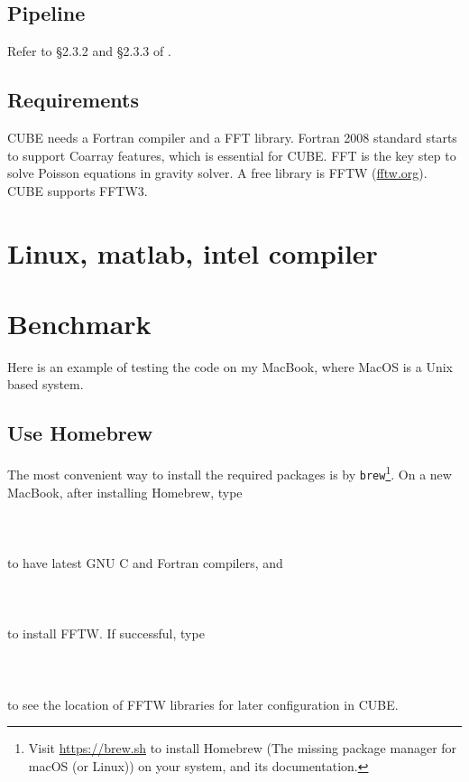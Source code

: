 \documentclass[12pt]{article}
\begin{document}
\subsection{Pipeline}

Refer to \S 2.3.2 and \S 2.3.3 of \cite{2018ApJS..237...24Y}.

\subsection{Requirements}

CUBE needs a Fortran compiler and a FFT library. Fortran 2008 standard starts to support Coarray features, which is essential for CUBE. FFT is the key step to solve Poisson equations in gravity solver. A free library is FFTW (\url{fftw.org}). CUBE supports FFTW3.

\section{Linux, matlab, intel compiler}

\section{Benchmark}
Here is an example of testing the code on my MacBook, where MacOS is a Unix based system. 

\subsection{Use Homebrew}

The most convenient way to install the required packages is by {\tt brew}\footnote{Visit \url{https://brew.sh} to install Homebrew (The missing package manager for macOS (or Linux)) on your system, and its documentation.}. On a new MacBook, after installing Homebrew, type
\\\\
 \\
\\
to have latest GNU C and Fortran compilers, and
\\\\
 \\
\\
to install FFTW. If successful, type
\\\\
 \\
\\
to see the location of FFTW libraries for later configuration in CUBE.
\end{document}
